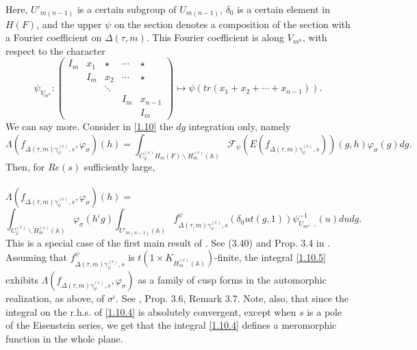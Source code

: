 \documentclass[12pts]{amsart}
\newcommand{\BA}{{\mathbb {A}}}
\begin{document}
Here, $U'_{m(n-1)}$ is a certain subgroup of $U_{m(n-1)}$,
$\delta_0$ is a certain element in $H(F)$, and the upper $\psi$ on the section denotes a composition of the section with a Fourier
coefficient on $\Delta(\tau,m)$. This Fourier coefficient is along $V_{m^n}$, with respect to the character
\begin{equation}\label{1.10.3.1}
\psi_{V_{m^n}}:\begin{pmatrix}I_m&x_1&\star&\cdots&\star\\&I_m&x_2&\cdots&\star\\&&\ddots\\&&&I_m&x_{n-1}\\
&&&&I_m\end{pmatrix}\mapsto\psi(tr(x_1+x_2+\cdots+x_{n-1})).
\end{equation}
We can say more. Consider in \eqref{1.10} the $dg$ integration only, namely
\begin{equation}\label{1.10.4}
\Lambda(f_{\Delta(\tau,	m)\gamma^{(\epsilon)}_\psi,s},\varphi_\sigma)(h)=
\int_{C_2^{(\epsilon)}H_m(F)\backslash
	H^{(\epsilon)}_m(\BA)}\mathcal{F}_\psi(E(f_{\Delta(\tau,
	m)\gamma^{(\epsilon)}_\psi,s}))(g,h)\varphi_\sigma(g)dg.
\end{equation} 
Then, for $Re(s)$ sufficiently large,\\
\\
$\Lambda(f_{\Delta(\tau,	m)\gamma^{(\epsilon)}_\psi,s},\varphi_\sigma)(h)=$ 
\begin{equation}\label{1.10.5}
\int_{C_2^{(\epsilon)}\backslash H^{(\epsilon)}_m(\BA)}\varphi_\sigma(h^\iota g)\int_{U'_{m(n-1)}(\BA)}
f^\psi_{\Delta(\tau, m)\gamma^{(\epsilon)}_\psi,s}(\delta_0ut(g,1))\psi^{-1}_{U_{m^{n-1}}}(u)dudg.
\end{equation}
This is a special case of the first main result of \cite{GS18}. See (3.40) and Prop. 3.4 in \cite{GS18}. Assuming that $f^\psi_{\Delta(\tau, m)\gamma^{(\epsilon)}_\psi,s}$ is $t(1\times K_{H_m^{(\epsilon)}(\BA)})$-finite,  the integral \eqref{1.10.5}  exhibits $\Lambda(f_{\Delta(\tau,
	m)\gamma^{(\epsilon)}_\psi,s},\varphi_\sigma)$ as a family of cusp forms in the automorphic realization, as above, of $\sigma^\iota$.  
See \cite{GS18}, Prop. 3.6, Remark 3.7. Note, also, that since the integral on the r.h.s. of \eqref{1.10.4} is absolutely convergent, except when $s$ is a pole of the Eisenstein series, we get that the integral \eqref{1.10.4} defines a meromorphic function in the whole plane.	
	
\end{document}
